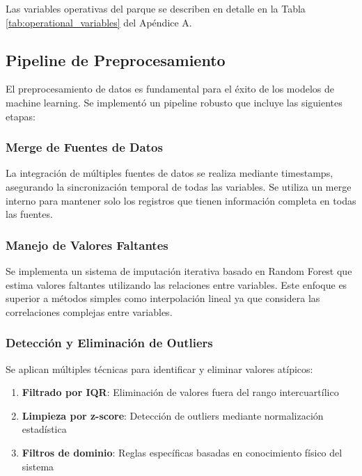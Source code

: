 \documentclass[conference]{IEEEtran}
\begin{document}
Las variables operativas del parque se describen en detalle en la Tabla \ref{tab:operational_variables} del Apéndice A.
	
\subsection{Pipeline de Preprocesamiento}

El preprocesamiento de datos es fundamental para el éxito de los modelos de machine learning. Se implementó un pipeline robusto que incluye las siguientes etapas:
	
\subsubsection{Merge de Fuentes de Datos}

La integración de múltiples fuentes de datos se realiza mediante timestamps, asegurando la sincronización temporal de todas las variables. Se utiliza un merge interno para mantener solo los registros que tienen información completa en todas las fuentes.
	
\subsubsection{Manejo de Valores Faltantes}

Se implementa un sistema de imputación iterativa basado en Random Forest que estima valores faltantes utilizando las relaciones entre variables. Este enfoque es superior a métodos simples como interpolación lineal ya que considera las correlaciones complejas entre variables.
	
\subsubsection{Detección y Eliminación de Outliers}
Se aplican múltiples técnicas para identificar y eliminar valores atípicos:

\begin{enumerate}

\item \textbf{Filtrado por IQR}: Eliminación de valores fuera del rango intercuartílico

\item \textbf{Limpieza por z-score}: Detección de outliers mediante normalización estadística

\item \textbf{Filtros de dominio}: Reglas específicas basadas en conocimiento físico del sistema

\end{enumerate}
	
\end{document}
